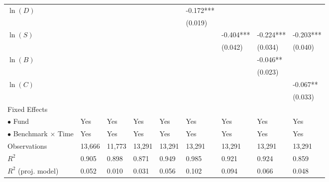 \documentclass[openany]{book}
\theoremstyle{definition}
\theoremstyle{definition}
\theoremstyle{definition}
\theoremstyle{remark}
\begin{document}
\begin{table}[ht]
\begin{tabularx}{0.975\textwidth}{lYYYYYYYY}
  $\ln(D)$ &  &  &  &  & -0.172*** &  &  &  \\ 
   &  &  &  &  & (0.019) &  &  &  \\ 
  $\ln(S)$ &  &  &  &  &  & -0.404*** & -0.224*** & -0.203*** \\ 
   &  &  &  &  &  & (0.042) & (0.034) & (0.040) \\ 
  $\ln(B)$ &  &  &  &  &  &  & -0.046** &  \\ 
   &  &  &  &  &  &  & (0.023) &  \\ 
  $\ln(C)$ &  &  &  &  &  &  &  & -0.067** \\ 
   &  &  &  &  &  &  &  & (0.033) \\ 
  Fixed Effects &  &  &  &  &  &  &  &  \\ 
  $\bullet$ Fund & Yes & Yes & Yes & Yes & Yes & Yes & Yes & Yes \\ 
  $\bullet$ Benchmark $\times$ Time & Yes & Yes & Yes & Yes & Yes & Yes & Yes & Yes \\ 
  Observations & 13,666 & 11,773 & 13,291 & 13,291 & 13,291 & 13,291 & 13,291 & 13,291 \\ 
  $R^2$ & 0.905 & 0.898 & 0.871 & 0.949 & 0.985 & 0.921 & 0.924 & 0.859 \\ 
  $R^2$ (proj. model) & 0.052 & 0.010 & 0.031 & 0.056 & 0.102 & 0.094 & 0.066 & 0.048 \\ 
   \bottomrule
\end{tabularx}
\endgroup
\end{table}
\end{document}
